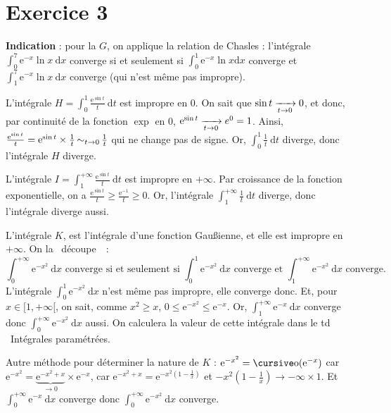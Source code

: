 \section{Exercice 3}

{\bf Indication}\/ : pour la $G$, on applique la relation de {\sc Chasles}\/ : l'intégrale $\int_0^7 \mathrm{e}^{-x}\ln x~\mathrm{d}x$\/ converge si et seulement si $\int_0^1 \mathrm{e}^{-x}\ln x\mathrm{d}x$\/ converge et $\int_1^7\mathrm{e}^{-x}\ln x~\mathrm{d}x$\/ converge (qui n'est même pas impropre).

L'intégrale $H = \int_0^1 \frac{\mathrm{e}^{\sin t}}{t}~\mathrm{d}t$\/ est impropre en 0. On sait que $\sin t \xrightarrow[t\to 0]{} 0$, et donc, par continuité de la fonction $\exp$\/ en $0$, $\mathrm{e}^{\sin t}\xrightarrow[t\to 0]{}e^0 = 1$.
Ainsi, $\frac{\mathrm{e}^{\sin t}}{t} = \mathrm{e}^{\sin t} \times \frac{1}{t} \operatorname*{\sim}_{t\to 0} \frac{1}{t}$\/ qui ne change pas de signe. Or, $\int_0^1 \frac{1}{t}~\mathrm{d}t$\/ diverge, donc l'intégrale $H$\/ diverge.

L'intégrale $I = \int_{1}^{+\infty} \frac{\mathrm{e}^{\sin t}}{t}~\mathrm{d}t$\/ est impropre en $+\infty$. Par croissance de la fonction exponentielle, on a $\frac{\mathrm{e}^{\sin t}}{t} \ge \frac{\mathrm{e}^{-1}}{t} \ge 0$. Or, l'intégrale $\int_{1}^{+\infty} \frac{1}{t}~\mathrm{d}t$\/ diverge, donc l'intégrale diverge aussi.

L'intégrale $K$, est l'intégrale d'une fonction Gau\ss ienne, et elle est impropre en $+\infty$. On la \guillemotleft~découpe~\guillemotright\ : \[
	\int_{0}^{+\infty} \mathrm{e}^{-x^2}~\mathrm{d}x \text{ converge si et seulement si } \int_{0}^{1} \mathrm{e}^{-x^2}~\mathrm{d}x \text{ converge et } \int_{1}^{+\infty} \mathrm{e}^{-x^2}~\mathrm{d}x \text{ converge.}
\] L'intégrale $\int_{0}^{1} \mathrm{e}^{-x^2}~\mathrm{d}x$\/ n'est même pas impropre, elle converge donc. Et, pour $x \in [1,+\infty[$, on sait, comme $x^2 \ge x$, $0 \le \mathrm{e}^{-x^2} \le \mathrm{e}^{-x}$. Or, $\int_{1}^{+\infty} \mathrm{e}^{-x}~\mathrm{d}x$\/ converge donc $\int_{0}^{+\infty} \mathrm{e}^{-x^2}~\mathrm{d}x$\/ aussi.
On calculera la valeur de cette intégrale dans le {\sc td}\/ \guillemotleft~Intégrales paramétrées.~\guillemotright

Autre méthode pour déterminer la nature de $K$\/ : 
$\mathrm{e}^{-x^2} = \po(\mathrm{e}^{-x})$\/ car $\mathrm{e}^{-x^2} = \underbrace{\mathrm{e}^{-x^2 + x}}_{\to 0} \times \mathrm{e}^{-x}$, car $\mathrm{e}^{-x^2 + x} = \mathrm{e}^{-x^2 \left( 1 - \frac{1}{x} \right)}$\/ et $-x^2\left( 1 - \frac{1}{x} \right) \to -\infty \times 1$.
Et $\int_0^{+\infty} \mathrm{e}^{-x}~\mathrm{d}x$\/ converge donc $\int_0^{+\infty} \mathrm{e}^{-x^2}~\mathrm{d}x$\/ converge.

